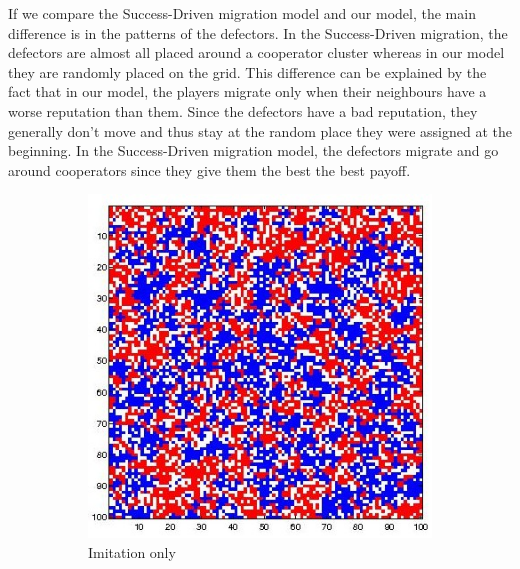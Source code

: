 \documentclass[11pt]{article}
\begin{document}
If we compare the Success-Driven migration model and our model, the main difference is in the patterns of the defectors. In the Success-Driven migration, the defectors are almost all placed around a cooperator cluster whereas in our model they are randomly placed on the grid. This difference can be explained by the fact that in our model, the players migrate only when their neighbours have a worse reputation than them. Since the defectors have a bad reputation, they generally don't move and thus stay at the random place they were assigned at the beginning. In the Success-Driven migration model, the defectors migrate and go around cooperators since they give them the best the best payoff.


\begin{figure}[h]
	\centering
	\begin{subfigure}[t]{0.4\textwidth}
        \includegraphics[width=\textwidth]{../../other/grids/m0-t200-a5-g300.jpg}
	\caption{Imitation only}
	\label{fig:grids_imitation0}
    	\end{subfigure}
	\begin{subfigure}[t]{0.4\textwidth}

\end{subfigure}
\end{figure}
\end{document}
